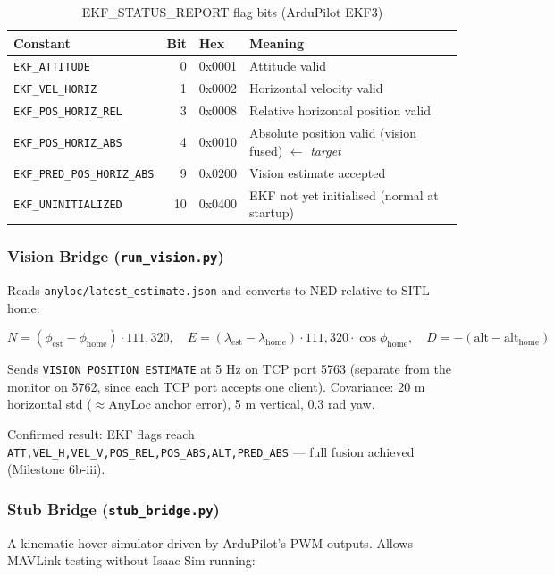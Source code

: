 \documentclass[11pt,a4paper]{article}
\begin{document}
\begin{table}[h]
\centering
\caption{EKF\_STATUS\_REPORT flag bits (ArduPilot EKF3)}
\begin{tabular}{@{}lrll@{}}
\toprule
\textbf{Constant} & \textbf{Bit} & \textbf{Hex} & \textbf{Meaning}\\
\midrule
\texttt{EKF\_ATTITUDE}        & 0  & 0x0001 & Attitude valid\\
\texttt{EKF\_VEL\_HORIZ}      & 1  & 0x0002 & Horizontal velocity valid\\
\texttt{EKF\_POS\_HORIZ\_REL} & 3  & 0x0008 & Relative horizontal position valid\\
\texttt{EKF\_POS\_HORIZ\_ABS} & 4  & 0x0010 & Absolute position valid (vision fused) $\leftarrow$ \textit{target}\\
\texttt{EKF\_PRED\_POS\_HORIZ\_ABS} & 9 & 0x0200 & Vision estimate accepted\\
\texttt{EKF\_UNINITIALIZED}   & 10 & 0x0400 & EKF not yet initialised (normal at startup)\\
\bottomrule
\end{tabular}
\end{table}

\subsubsection*{Vision Bridge (\texttt{run\_vision.py})}

Reads \texttt{anyloc/latest\_estimate.json} and converts to NED relative to SITL home:

\[
  N = (\phi_\text{est} - \phi_\text{home}) \cdot 111{,}320, \quad
  E = (\lambda_\text{est} - \lambda_\text{home}) \cdot 111{,}320 \cdot \cos\phi_\text{home}, \quad
  D = -(\text{alt} - \text{alt}_\text{home})
\]

Sends \texttt{VISION\_POSITION\_ESTIMATE} at 5 Hz on TCP port 5763 (separate from the
monitor on 5762, since each TCP port accepts one client).  Covariance: 20 m horizontal
std ($\approx$AnyLoc anchor error), 5 m vertical, 0.3 rad yaw.

Confirmed result: EKF flags reach \texttt{ATT,VEL\_H,VEL\_V,POS\_REL,POS\_ABS,ALT,PRED\_ABS}
--- full fusion achieved (Milestone 6b-iii).

\subsubsection*{Stub Bridge (\texttt{stub\_bridge.py})}

A kinematic hover simulator driven by ArduPilot's PWM outputs.  Allows MAVLink
testing without Isaac Sim running:
\end{document}
